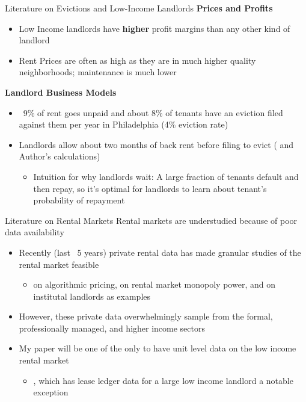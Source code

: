 \documentclass[10pt, xcolor=dvipsnames]{beamer}
\begin{document}
\begin{frame}{Literature on Evictions and Low-Income Landlords}
    \textbf{Prices and Profits}
        \begin{itemize}
                \item Low Income landlords have \textbf{higher} profit margins than any other kind of landlord \parencite{Desmond_2019, Damen_2025, Eisfeldt_2015}
                \item Rent Prices are often as high as they are in much higher quality neighborhoods; maintenance is much lower 
        \end{itemize}
    \pause 
    \textbf{Landlord Business Models}
    \begin{itemize}
        \item ~9\% of rent goes unpaid \parencite{collinson2024eviction} and about 8\% of tenants have an eviction filed against them per year in Philadelphia (4\% eviction rate)
        \item Landlords allow about two months of back rent before filing to evict (\cite{humphries-2024} and Author's calculations)
        \begin{itemize}
            \item Intuition for why landlords wait: A large fraction of tenants default and then repay, so it's optimal for landlords to learn about tenant's probability of repayment
        \end{itemize}
    \end{itemize}
    
\end{frame}

\begin{frame}{Literature on Rental Markets}
    Rental markets are understudied because of poor data availability\\
    \vspace{0.25cm}
    \begin{itemize}
        \item Recently (last ~5 years) private rental data has made granular studies of the rental market feasible
        \begin{itemize}
            \item \cite{calderwang2024algorithmic} on algorithmic pricing, \cite{framoutar2024market} on rental market monopoly power, and \cite{gurun-et-al-2022} on institutal landlords as examples
        \end{itemize}
        \item However, these private data overwhelmingly sample from the formal, professionally managed, and higher income sectors
        \item My paper will be one of the only to have unit level data on the low income rental market
        \begin{itemize}
            \item \cite{humphries-2024}, which has lease ledger data for a large low income landlord a notable exception
        \end{itemize}
    \end{itemize}
\end{frame}
\end{document}
